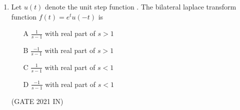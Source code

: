 \begin{enumerate}[label=\thechapter.\arabic*,ref=\thechapter.\theenumi]
\solution

\pagebreak
\item Let $ u(t) $ denote the unit step function . The bilateral laplace transform function  $ f(t) = e^t u(-t) $ is 
\begin{enumerate}
\item[A] $ \frac{1}{s-1}$ with real part of $ s> 1$
\item[B]$\frac{-1}{s-1}$ with real part of $ s> 1$
\item[C]$\frac{1}{s-1}$ with real part of $ s< 1$
\item[D]$\frac{-1}{s-1}$ with real part of $ s< 1$
\end{enumerate}
\hfill (GATE 2021 IN) \\
\solution

\end{enumerate}